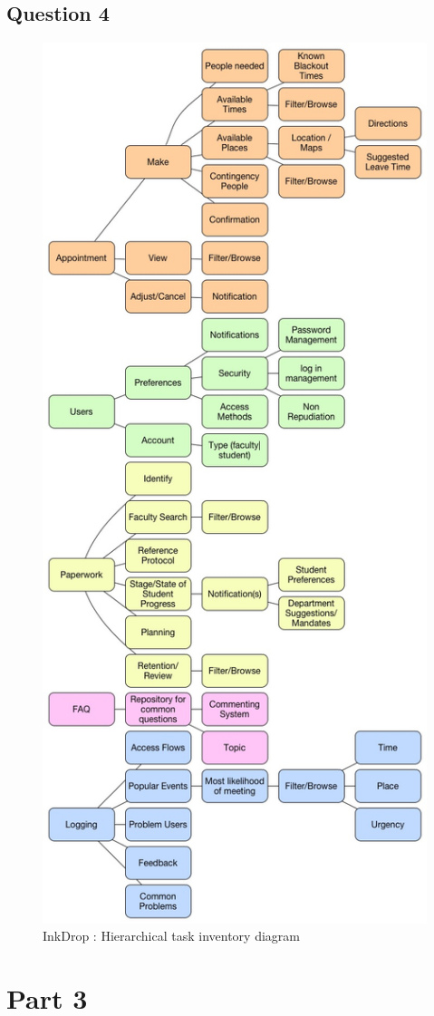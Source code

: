 \documentclass[11pt]{article}
\begin{document}
  \subsection*{Question 4}
  \begin{figure}[H]
  \centering
  \includegraphics[height=0.9\linewidth]{img/task.jpg}
  \caption{InkDrop : Hierarchical task inventory diagram}
  \label{fig:task}
  \end{figure}

\section*{Part 3} %

\end{document}
